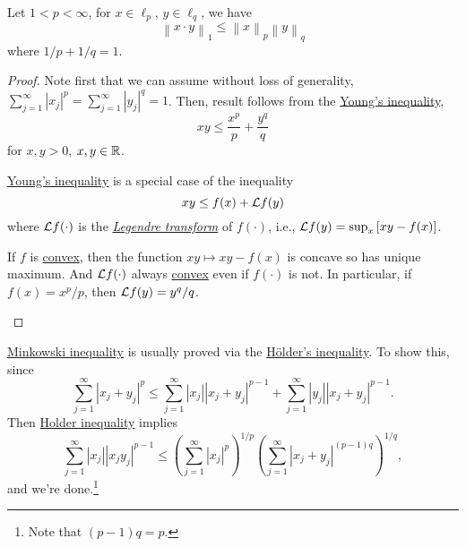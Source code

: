\begin{lemma}\label{lma:Holder-ineq}
	Let \(1<p<\infty \), for \(x\in \ell _p\), \(y\in \ell _q\), we have
	\[
		\left\lVert x\cdot y\right\rVert_1 \leq \left\lVert x\right\rVert _p \left\lVert y\right\rVert _q
	\]
	where \(1 / p + 1 / q = 1\).
\end{lemma}
\begin{proof}
	Note first that we can assume without loss of generality, \(\sum_{j=1}^{\infty} \left\vert x_{j}  \right\vert ^p = \sum_{j=1}^{\infty} \left\vert y_{j}  \right\vert ^{q} = 1\). Then, result follows from the \href{https://en.wikipedia.org/wiki/Young's_inequality_for_products}{Young's inequality},
	\[
		xy \leq \frac{x^p}{p} + \frac{y^q}{q}
	\]
	for \(x, y> 0\), \(x, y\in \mathbb{\MakeUppercase{r}} \).
	\begin{remark}
		\href{https://en.wikipedia.org/wiki/Young's_inequality_for_products}{Young's inequality} is a special case of the inequality
		\[
			xy \leq f(x) + \mathcal{\MakeUppercase{l}} f(y)
		\]
		where \(\mathcal{\MakeUppercase{l}} f(\cdot)\) is the \href{https://en.wikipedia.org/wiki/Legendre_transformation}{\emph{Legendre transform}} of \(f(\cdot)\), i.e., \(\mathcal{\MakeUppercase{l}} f(y) = \sup _x \left[ xy - f(x) \right]\).

		If \(f\) is \hyperref[def:convex-function]{convex}, then the function \(xy\mapsto xy - f(x)\) is concave so has unique maximum. And \(\mathcal{\MakeUppercase{l}} f(\cdot)\) always \hyperref[def:convex-function]{convex} even if \(f(\cdot)\) is not. In particular, if \(f(x) = x^p / p\), then \(\mathcal{\MakeUppercase{l}} f(y) = y^q / q\).
	\end{remark}
\end{proof}

\begin{note}
	\hyperref[lma:Minkowski-ineq]{Minkowski inequality} is usually proved via the \hyperref[lma:Holder-ineq]{Hölder's inequality}. To show this, since
	\[
		\sum_{j=1}^{\infty} \left\vert x_j + y_j \right\vert ^p \leq \sum_{j=1}^{\infty} \left\vert x_{j}  \right\vert \left\vert x_{j} +y_{j}  \right\vert ^{p - 1} + \sum_{j=1}^{\infty} \left\vert y_{j}  \right\vert \left\vert x_{j} +y_{j}  \right\vert ^{p-1}.
	\]
	Then \hyperref[lma:Holder-ineq]{Holder inequality} implies
	\[
		\sum_{j=1}^{\infty} \left\vert x_{j}  \right\vert \left\vert x_{j} y_{j}  \right\vert ^{p-1}\leq \left( \sum_{j=1}^{\infty} \left\vert x_{j}  \right\vert^p \right) ^{1 / p} \left( \sum_{j=1}^{\infty} \left\vert x_{j} +y_{j}  \right\vert^{(p - 1)q}  \right) ^{1 / q},
	\]
	and we're done.\footnote{Note that \((p-1)q = p\).}
\end{note}

